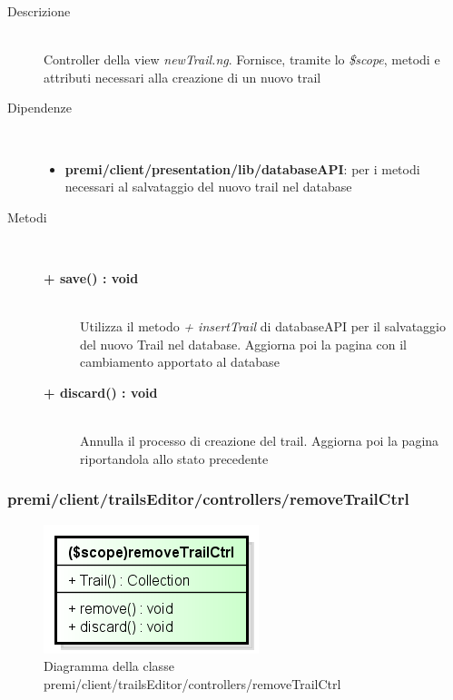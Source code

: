\begin{description}
\item[Descrizione] \hfill \\
	Controller della view \textit{newTrail.ng}. Fornisce, tramite lo \textit{\$scope}, metodi e attributi necessari alla creazione di un nuovo trail
	
	
\item[Dipendenze] \hfill \\
	\begin{itemize}
		\item \textbf{premi/client/presentation/lib/databaseAPI}: per i metodi necessari al salvataggio del nuovo trail nel database
	\end{itemize}
	
	
\item[Metodi] \hfill \\

	\begin{description}
		\item[\textbf{\color{blue}+ save() : void			}] \hfill \\
			Utilizza il metodo \textit{+ insertTrail} di databaseAPI per il salvataggio del nuovo Trail nel database. Aggiorna poi la pagina con il cambiamento apportato al database
	\end{description}
	
	\begin{description}
		\item[\textbf{\color{blue}+ discard() : void			}] \hfill \\
			Annulla il processo di creazione del trail. Aggiorna poi la pagina riportandola allo stato precedente
	\end{description}

\end{description}
	






\subsubsection{premi/client/trailsEditor/controllers/removeTrailCtrl}
\begin{figure}[h]
\begin{center}
\includegraphics[scale=0.55]{img/diacla/removeTrailCtrl.png}
\caption{Diagramma della classe premi/client/trailsEditor/controllers/removeTrailCtrl}
\end{center}
\end{figure}


